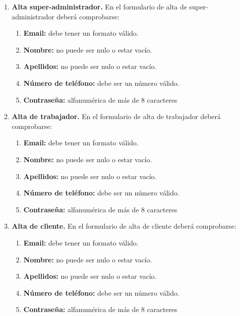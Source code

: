 \begin{enumerate}[leftmargin=1.75cm,start=1,label={\bfseries RS-\arabic*.}]
\setlength\itemsep{1em} %

    \item \textbf{Alta super-administrador.} En el formulario de alta de super-administrador deberá comprobarse:
    \begin{enumerate}[start=1,label={\bfseries RS-1.\arabic*.}]
        \item \textbf{Email:} debe tener un formato válido.
        \item \textbf{Nombre:} no puede ser nulo o estar vacío.
        \item \textbf{Apellidos:} no puede ser nulo o estar vacío.
        \item \textbf{Número de teléfono:} debe ser un número válido.
        \item \textbf{Contraseña:} alfanumérica de más de 8 caracteres
    \end{enumerate}

    \item \textbf{Alta de trabajador.} En el formulario de alta de trabajador deberá comprobarse:
    \begin{enumerate}[start=1,label={\bfseries RS-2.\arabic*.}]
        \item \textbf{Email:} debe tener un formato válido.
        \item \textbf{Nombre:} no puede ser nulo o estar vacío.
        \item \textbf{Apellidos:} no puede ser nulo o estar vacío.
        \item \textbf{Número de teléfono:} debe ser un número válido.
        \item \textbf{Contraseña:} alfanumérica de más de 8 caracteres
    \end{enumerate}

    \item \textbf{Alta de cliente.} En el formulario de alta de cliente deberá comprobarse:
    \begin{enumerate}[start=1,label={\bfseries RS-3.\arabic*.}]
        \item \textbf{Email:} debe tener un formato válido.
        \item \textbf{Nombre:} no puede ser nulo o estar vacío.
        \item \textbf{Apellidos:} no puede ser nulo o estar vacío.
        \item \textbf{Número de teléfono:} debe ser un número válido.
        \item \textbf{Contraseña:} alfanumérica de más de 8 caracteres
    \end{enumerate}


\end{enumerate}
